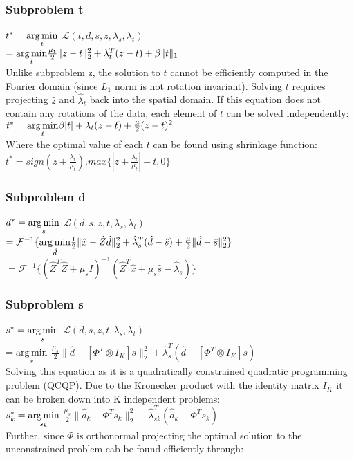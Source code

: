 \subsubsection{Subproblem t}
$t^* =  \underset{t}{\operatorname*{arg\,min}}$ $ \mathcal{L}(t,d,s,z,\lambda_s,\lambda_t)$\\
$ =  \underset{t}{\operatorname*{arg\,min}}\frac{\mu_t}{2} \|z - t\|^2_2 + \lambda_t^T(z-t) + \beta\|t\|_1$\\
Unlike subproblem z, the solution to $t$ cannot be efficiently computed in the Fourier domain (since $L_1$ norm is not rotation invariant). Solving $t$ requires projecting $\hat{z}$ and $\hat{\lambda}_t$ back into the spatial domain. If this equation does not contain any rotations of the data, each element of $t$ can be solved independently:\vspace{0.3cm}\\
$t^* =  \underset{t}{\operatorname*{arg\,min}} \beta |t| + \lambda_t(z-t) + \frac{\mu}{2}(z-t)^2$\\
Where the optimal value of each $t$ can be found using shrinkage function:\vspace{0.5cm}\\
$t^* = sign(z + \frac{\lambda_t}{\mu_t}) . max\{|z + \frac{\lambda_t}{\mu_t} | - t , 0\}$

\subsubsection{Subproblem d}
$d^* =  \underset{s}{\operatorname*{arg\,min}}$ $  \mathcal{L}(d,s,z,t,\lambda_s, \lambda_t)$\\ 
$ = \mathcal{F}^{-1} \{ \underset{\hat{d}}{\operatorname*{arg\,min}}\frac{1}{2} \|\hat{x} - \hat{Z}\hat{d}\|^2_2 + \hat{\lambda}_s^T(\hat{d}- \hat{s}) + \frac{\mu}{2}\|\hat{d} - \hat{s}\|^2_2\}$\\
$ = \mathcal{F}^{-1}\{(\hat{Z}^T \hat{Z} + \mu_s I)^{-1} (\hat{Z}^T \hat{x} + \mu_s \hat{s} - \hat{\lambda}_s)\}$
\subsubsection{Subproblem s}
$s^* =\underset{s}{\operatorname*{arg\,min}}$ $  \mathcal{L}(d,s,z,t,\lambda_s, \lambda_t) $\\
$  = \underset{s}{\operatorname*{arg\,min}}$ $\frac{\mu_s}{2} \|\hat{d} - [\Phi^T \otimes I_K]s\|^2_2 + \hat{\lambda}_s^T(\hat{d} - [\Phi^T \otimes I_K]s)$\\
Solving this equation as it is a quadratically constrained quadratic programming problem (QCQP).  Due to the Kronecker product with the identity matrix $I_K$ it can be broken down into K independent problems:\\
$s^*_k = \underset{s_k}{\operatorname*{arg\,min}}$ $\frac{\mu_s}{2} \|\hat{d}_k  - \Phi^T s_k\|^2_2 + \hat{\lambda}_{sk}^T(\hat{d}_k - \Phi^T s_k)$\\
Further, since $\Phi$ is orthonormal projecting the optimal solution to the unconstrained problem cab be found efficiently through:\\


